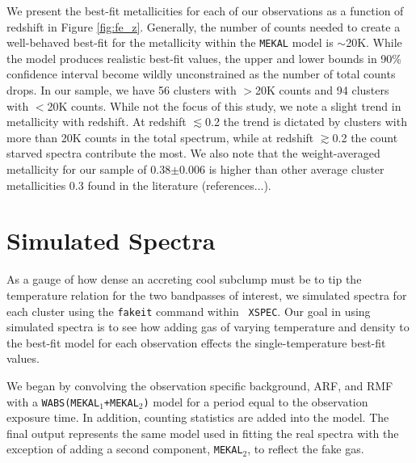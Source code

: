 \documentclass[12pt, preprint]{aastex}
\begin{document}
We present the best-fit metallicities for each of our observations as a
function of redshift in Figure \ref{fig:fe_z}. Generally, the number
of counts needed to create a well-behaved best-fit for the
metallicity within the {\tt MEKAL} model is $\sim$20K. While the
model produces realistic best-fit values, the upper and lower bounds
in 90\% confidence interval become wildly unconstrained as the number of
total counts drops. In our sample, we have 56 clusters with $>$20K
counts and 94 clusters with $<$20K counts. While not the focus of this
study, we note a slight trend in metallicity with redshift. At
redshift $\lesssim$0.2 the trend is dictated by clusters
with more than 20K counts in the total spectrum, while at redshift
$\gtrsim$0.2 the count starved spectra contribute the most. We also
note that the weight-averaged metallicity for our sample of
0.38$\pm0.006$ is higher than other average cluster metallicities 0.3
found in the literature (references...).


\section{Simulated Spectra}\label{sec:simulated}

As a gauge of how dense an accreting cool subclump must be to tip the
temperature relation for the two bandpasses of interest, we simulated
spectra for each cluster using the {\tt fakeit} command within {\tt
XSPEC}. Our goal in using simulated spectra is to see how adding gas
of varying temperature and density to the best-fit model for each
observation effects the single-temperature best-fit values.

We began by convolving the observation specific background, ARF, and RMF
with a {\tt WABS(MEKAL$_{1}$+MEKAL$_{2}$)} model for a period equal to
the observation exposure time. In addition, counting statistics are
added into the model. The final output represents the same model
used in fitting the real spectra with the exception of adding a second
component, {\tt MEKAL$_{2}$}, to reflect the fake gas.
\end{document}
